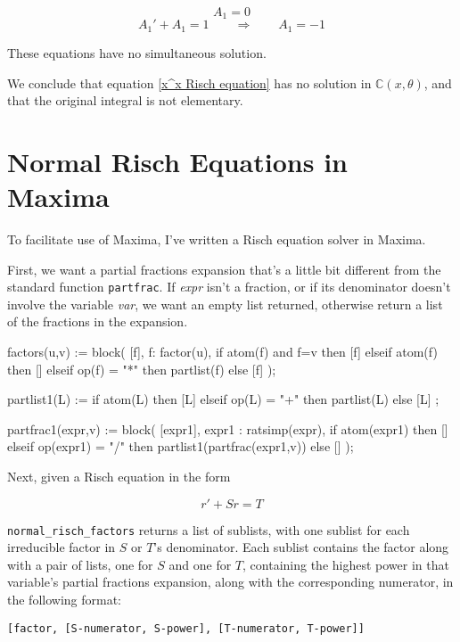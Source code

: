 $$A_1 = 0$$
$$A_1' + A_1 = 1 \qquad\Longrightarrow\qquad A_1 = -1$$

These equations have no simultaneous solution.

We conclude that equation \eqref{x^x Risch equation} has no solution
in ${\mathbb C}(x, \theta)$, and that the original integral
is not elementary.

\endexample

\vfill\eject
\section{Normal Risch Equations in Maxima}

To facilitate use of Maxima, I've written a Risch equation
solver in Maxima.

First, we want a partial fractions expansion that's a little bit
different from the standard function {\tt partfrac}.  If {\it expr}
isn't a fraction, or if its denominator doesn't involve the variable
{\it var}, we want an empty list returned, otherwise return a list of
the fractions in the expansion.

\begin{maximacommon}
factors(u,v) := block(
   [f],
   f: factor(u),
   if atom(f) and f=v then [f]
   elseif atom(f) then []
   elseif op(f) = "*" then partlist(f)
   else [f]
);

partlist1(L) :=
   if atom(L) then [L]
   elseif op(L) = "+" then partlist(L)
   else [L]
;

partfrac1(expr,v) := block(
   [expr1],
   expr1 : ratsimp(expr),
   if atom(expr1) then []
   elseif op(expr1) = "/" then
      partlist1(partfrac(expr1,v))
   else []
);
\end{maximacommon}

Next, given a Risch equation in the form

$$r' + S r = T$$

{\tt normal_risch_factors} returns a list of sublists, with one
sublist for each irreducible factor in $S$ or $T$'s denominator.  Each
sublist contains the factor along with a pair of lists, one for $S$
and one for $T$, containing the highest power in that
variable's partial fractions expansion, along with the corresponding
numerator, in the following format:

\begin{center}
\begin{verbatim}
[factor, [S-numerator, S-power], [T-numerator, T-power]]
\end{verbatim}
\end{center}

